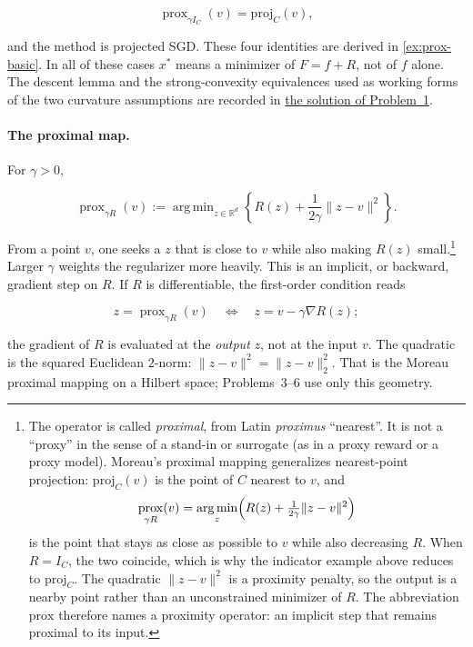 \documentclass[11pt,a4paper]{article}
\DeclareMathOperator*{\argmin}{arg\,min}
\DeclareMathOperator{\prox}{prox}
\newcommand{\jump}[2]{\hyperref[#1]{#2}}
\theoremstyle{definition}
\begin{document}
\[
\prox_{\gamma I_C}(v)=\mathrm{proj}_C(v),
\]

and the method is projected SGD. These four identities are derived in \cref{ex:prox-basic}. In all of these cases $x^*$ means a minimizer of $F=f+R$, not of $f$ alone. The descent lemma and the strong-convexity equivalences used as working forms of the two curvature assumptions are recorded in \jump{sol:spr2025-opt-1}{the solution of Problem~1}.

\paragraph{The proximal map.}
For $\gamma>0$,

\[
\prox_{\gamma R}(v)
:=\argmin_{z\in\mathbb{R}^d}
\left\{
R(z)+\frac{1}{2\gamma}\|z-v\|^2
\right\}.
\]

From a point $v$, one seeks a $z$ that is close to $v$ while also making $R(z)$ small.\footnote{The operator is called \emph{proximal}, from Latin \emph{proximus} ``nearest''. It is not a ``proxy'' in the sense of a stand-in or surrogate (as in a proxy reward or a proxy model). Moreau's proximal mapping generalizes nearest-point projection: $\mathrm{proj}_C(v)$ is the point of $C$ nearest to $v$, and
\[
\prox_{\gamma R}(v)
=\argmin_z\Bigl(R(z)+\tfrac{1}{2\gamma}\|z-v\|^2\Bigr)
\]
is the point that stays as close as possible to $v$ while also decreasing $R$. When $R=I_C$, the two coincide, which is why the indicator example above reduces to $\mathrm{proj}_C$. The quadratic $\|z-v\|^2$ is a proximity penalty, so the output is a nearby point rather than an unconstrained minimizer of $R$. The abbreviation $\mathrm{prox}$ therefore names a proximity operator: an implicit step that remains proximal to its input.} Larger $\gamma$ weights the regularizer more heavily. This is an implicit, or backward, gradient step on $R$. If $R$ is differentiable, the first-order condition reads

\[
z=\prox_{\gamma R}(v)
\quad\Longleftrightarrow\quad
z=v-\gamma\nabla R(z);
\]

the gradient of $R$ is evaluated at the \emph{output} $z$, not at the input $v$.
The quadratic is the squared Euclidean $2$-norm: $\|z-v\|^2=\|z-v\|_2^2$. That is
the Moreau proximal mapping on a Hilbert space; Problems~3--6 use only this
geometry.
\end{document}
